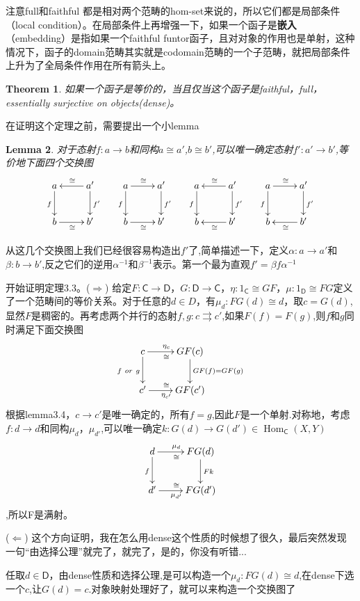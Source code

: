 \documentclass[UTF8,11pt,a4paper]{ctexart}
\newtheorem{theorem}{Theorem}[section]
\newtheorem{lemma}[theorem]{Lemma}
\newcommand{\tbf}{\textbf}
\newcommand*{\cat}[1]{\textsf{#1}\xspace}
\newcommand{\al}{\alpha}
\newcommand{\be}{\beta}
\newcommand*{\xfunc}[4]{{#2}\colon{#3}{#1}{#4}}
\newcommand*{\func}[3]{\xfunc{\to}{#1}{#2}{#3}}
\newcommand*{\pfunc}[3]{\xfunc{\rightrightarrows}{#1}{#2}{#3}}
\newcommand*{\isom}[3]{\xfunc{\cong}{#1}{#2}{#3}}
\DeclareMathOperator{\Hom}{Hom}
\begin{document}
注意full和faithful 都是相对两个范畴的hom-set来说的，所以它们都是局部条件（local condition）。在局部条件上再增强一下，如果一个函子是\tbf{嵌入}（embedding）是指如果一个faithful funtor函子，且对对象的作用也是单射，这种情况下，函子的domain范畴其实就是codomain范畴的一个子范畴，就把局部条件上升为了全局条件作用在所有箭头上。

\begin{theorem}
如果一个函子是等价的，当且仅当这个函子是faithful，full，essentially surjective on objects(dense)。
\end{theorem}

在证明这个定理之前，需要提出一个小lemma

\begin{lemma}
对于态射$\func{f}{a}{b}$和同构$a \cong a'$,$b \cong b'$,可以唯一确定态射$\func{f'}{a'}{b'}$,等价地下面四个交换图
\[\xymatrix{
	a\ar[d]_{f} & a'\ar[l]_{\cong}\ar[d]^{f'} &
	a\ar[d]_{f}\ar[r]^{\cong} & a'\ar[d]^{f'} &
	a\ar[d]_{f} & a'\ar[l]_{\cong}\ar[d]^{f'} &
	a\ar[d]_{f}\ar[r]^{\cong} & a'\ar[d]^{f'} \\
	b\ar[r]_{\cong} & b' &
	b\ar[r]_{\cong} & b' &
	b & b'\ar[l]^{\cong} &
	b & b'\ar[l]^{\cong}
	}\]
\end{lemma}
从这几个交换图上我们已经很容易构造出$f'$了,简单描述一下，定义$\func{\al}{a}{a'}$和$\func{\be}{b}{b'}$,反之它们的逆用$\al^{-1}$和$\be^{-1}$表示。第一个最为直观$f'=\be f \al^{-1}$

开始证明定理3.3。($\Longrightarrow$) 给定$\func{F}{\cat{C}}{\cat{D}}$，$\func{G}{\cat{D}}{\cat{C}}$，$\isom{\eta}{1_{\cat{C}}}{GF}$，$\isom{\mu}{1_{\cat{D}}}{FG}$定义了一个范畴间的等价关系。对于任意的$d \in D$，有$\isom{\mu_d}{FG(d)}{d}$，取$c=G(d)$,显然$F$是稠密的。再考虑两个并行的态射$\pfunc{f,g}{c}{c'}$,如果$F(f)=F(g)$,则$f$和$g$同时满足下面交换图
\[\xymatrix{
	c\ar[d]_{f\ or\ g}\ar[r]_{\cong}^{\eta_c} & GF(c)\ar[d]^{GF(f)=GF(g)}\\
	c'\ar[r]_{\eta_{c'}}^{\cong} & GF(c')
	}\]	根据lemma3.4，$c \rightarrow c'$是唯一确定的，所有$f=g$,因此$F$是一个单射.对称地，考虑$\func{f}{d}{d}$和同构$\mu_{d}$，$\mu_{d'}$,可以唯一确定$\func{k}{G(d)}{G(d')} \in \Hom_\cat{C}(X,Y) $\[\xymatrix{
	d\ar[d]_{f}\ar[r]_{\cong}^{\mu_d} & FG(d)\ar[d]^{Fk}\\
	d'\ar[r]_{\mu_{d'}}^{\cong} & FG(d')
	}\],所以F是满射。
	
($\Longleftarrow$) 这个方向证明，我在怎么用dense这个性质的时候想了很久，最后突然发现一句“由选择公理”就完了，就完了，是的，你没有听错...

任取$d \in \cat{D}$，由dense性质和选择公理,是可以构造一个$\isom{\mu_d}{FG(d)}{d}$,在dense下选一个$c$,让$G(d)=c$.对象映射处理好了，就可以来构造一个交换图了
		
\end{document}
